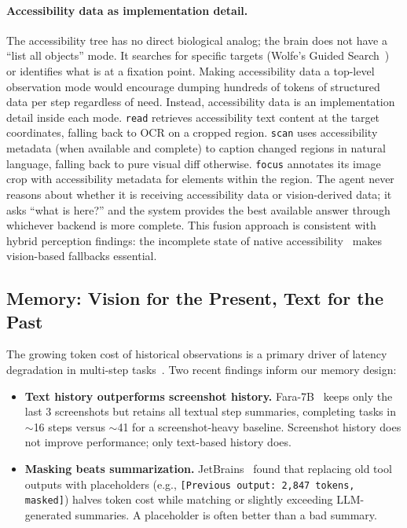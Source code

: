 \documentclass[11pt,a4paper]{article}
\begin{document}
\paragraph{Accessibility data as implementation detail.}
The accessibility tree has no direct biological analog; the brain does not
have a ``list all objects'' mode. It searches for specific targets (Wolfe's
Guided Search~\cite{wolfe-guided-search}) or identifies what is at a fixation
point. Making accessibility data a top-level observation mode would encourage
dumping hundreds of tokens of structured data per step regardless of need.
Instead, accessibility data is an implementation detail inside each mode.
\texttt{read} retrieves accessibility text content at the target coordinates,
falling back to OCR on a cropped region. \texttt{scan} uses accessibility
metadata (when available and complete) to caption changed regions in natural
language, falling back to pure visual diff otherwise. \texttt{focus}
annotates its image crop with accessibility metadata for elements within the
region. The agent never reasons about whether it is receiving accessibility
data or vision-derived data; it asks ``what is here?'' and the system
provides the best available answer through whichever backend is more
complete. This fusion approach is consistent with hybrid perception
findings: the incomplete state of native accessibility~\cite{screen2ax} makes
vision-based fallbacks essential.

\subsection{Memory: Vision for the Present, Text for the Past}
\label{sec:memory}

The growing token cost of historical observations is a primary driver of
latency degradation in multi-step tasks~\cite{osworld-human}. Two recent findings inform our memory design:

\begin{itemize}[leftmargin=*,itemsep=2pt]
  \item \textbf{Text history outperforms screenshot history.}
    Fara-7B~\cite{fara-7b} keeps only the last 3 screenshots but retains
    all textual step summaries, completing tasks in $\sim$16 steps versus
    $\sim$41 for a screenshot-heavy baseline. Screenshot history does not improve performance; only text-based history does.
  \item \textbf{Masking beats summarization.}
    JetBrains~\cite{jetbrains-complexity-trap} found that replacing old tool
    outputs with placeholders (e.g., \texttt{[Previous output: 2,847 tokens,
    masked]}) halves token cost while matching or slightly exceeding
    LLM-generated summaries. A placeholder is often better than a bad summary.
\end{itemize}
\end{document}
